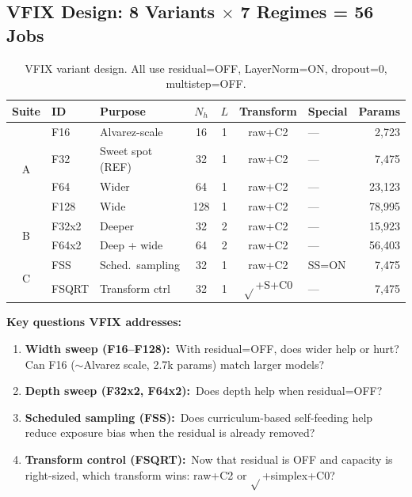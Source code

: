 \documentclass[11pt,letterpaper]{article}
\begin{document}
\subsection{VFIX Design: 8 Variants $\times$ 7 Regimes = 56 Jobs}

\begin{table}[H]
\centering
\caption{VFIX variant design. All use residual=OFF, LayerNorm=ON, dropout=0, multistep=OFF.}
\label{tab:vfix-design}
\small
\begin{tabular}{@{}cllccclr@{}}
\toprule
Suite & ID & Purpose & $N_h$ & $L$ & Transform & Special & Params \\
\midrule
\multirow{4}{*}{A}
  & F16  & Alvarez-scale    & 16  & 1 & raw+C2 & --- & 2,723  \\
  & F32  & Sweet spot (REF) & 32  & 1 & raw+C2 & --- & 7,475  \\
  & F64  & Wider            & 64  & 1 & raw+C2 & --- & 23,123 \\
  & F128 & Wide             & 128 & 1 & raw+C2 & --- & 78,995 \\
\midrule
\multirow{2}{*}{B}
  & F32x2 & Deeper          & 32  & 2 & raw+C2 & --- & 15,923 \\
  & F64x2 & Deep + wide     & 64  & 2 & raw+C2 & --- & 56,403 \\
\midrule
\multirow{2}{*}{C}
  & FSS   & Sched.\ sampling & 32  & 1 & raw+C2 & SS=ON & 7,475  \\
  & FSQRT & Transform ctrl   & 32  & 1 & $\sqrt{}$+S+C0 & --- & 7,475 \\
\bottomrule
\end{tabular}
\end{table}

\textbf{Key questions VFIX addresses:}
\begin{enumerate}[nosep]
  \item \textbf{Width sweep (F16--F128):}\ With residual=OFF, does wider help or hurt?
        Can F16 ($\sim$Alvarez scale, 2.7k params) match larger models?
  \item \textbf{Depth sweep (F32x2, F64x2):}\ Does depth help when residual=OFF?
  \item \textbf{Scheduled sampling (FSS):}\ Does curriculum-based self-feeding
        help reduce exposure bias when the residual is already removed?
  \item \textbf{Transform control (FSQRT):}\ Now that residual is OFF and capacity
        is right-sized, which transform wins: raw+C2 or $\sqrt{}$+simplex+C0?
\end{enumerate}
\end{document}
